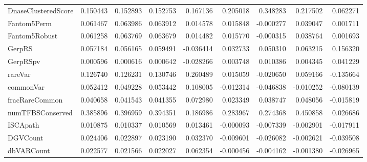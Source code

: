 \begin{tabular}{lrrrrrrrr}
DnaseClusteredScore &  0.150443 &   0.152893 &   0.152753 &   0.167136 &    0.205018 &    0.348283 &    0.217502 &   0.062271 \\
Fantom5Perm         &  0.061467 &   0.063986 &   0.063912 &   0.014578 &    0.015848 &   -0.000277 &    0.039047 &   0.001711 \\
Fantom5Robust       &  0.061258 &   0.063769 &   0.063679 &   0.014482 &    0.015770 &   -0.000315 &    0.038764 &   0.001693 \\
GerpRS              &  0.057184 &   0.056165 &   0.059491 &  -0.036414 &    0.032733 &    0.050310 &    0.063215 &   0.156320 \\
GerpRSpv            &  0.000596 &   0.000616 &   0.000642 &  -0.028266 &    0.003748 &    0.010386 &    0.004345 &   0.041229 \\
rareVar             &  0.126740 &   0.126231 &   0.130746 &   0.260489 &    0.015059 &   -0.020650 &    0.059166 &  -0.135664 \\
commonVar           &  0.052412 &   0.049228 &   0.053442 &   0.108005 &   -0.012314 &   -0.046838 &   -0.010252 &  -0.080139 \\
fracRareCommon      &  0.040658 &   0.041543 &   0.041355 &   0.072980 &    0.023349 &    0.038747 &    0.048056 &  -0.015819 \\
numTFBSConserved    &  0.385896 &   0.396959 &   0.394351 &   0.186986 &    0.283967 &    0.274368 &    0.450858 &   0.026686 \\
ISCApath            &  0.010875 &   0.010337 &   0.010569 &   0.013461 &   -0.000093 &   -0.007339 &   -0.002901 &  -0.017911 \\
DGVCount            &  0.024406 &   0.022897 &   0.023190 &   0.032370 &   -0.009601 &   -0.026082 &   -0.002621 &  -0.039508 \\
dbVARCount          &  0.022577 &   0.021566 &   0.022027 &   0.062354 &   -0.000456 &   -0.004162 &   -0.001380 &  -0.026965 \\
\bottomrule
\end{tabular}
